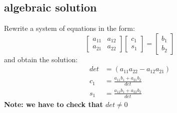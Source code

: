 \documentclass[11pt]{article}
\begin{document}
\subsection{algebraic solution}
Rewrite a system of equations in the form:
\begin{equation}
    \begin{bmatrix}
    a_{11} & a_{12} \\
    a_{21} & a_{22}
    \end{bmatrix}
    \begin{bmatrix}
    c_1 \\
    s_1
    \end{bmatrix}
    =
    \begin{bmatrix}
    b_1 \\
    b_2
    \end{bmatrix}
\end{equation}
and obtain the solution:
\begin{align}
    det &=(a_{11}a_{22}-a_{12}a_{21})\\
    c_1 &= \frac{a_{11}b_1+a_{21}b_2}{det} \\
    s_1 &= \frac{a_{12}b_1+a_{22}b_2}{det}
\end{align}
\textbf{Note: we have to check that $det \neq 0$}
\end{document}
